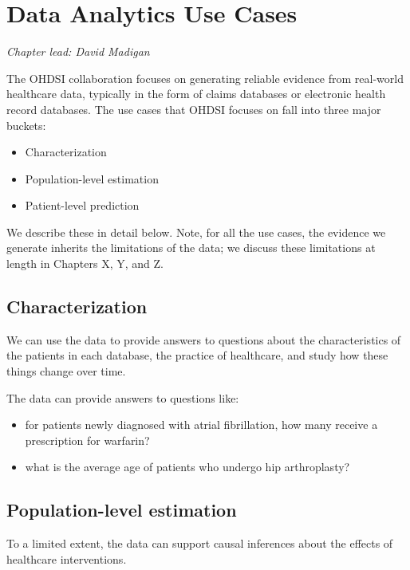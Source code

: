 \documentclass[11pt]{book}
\providecommand{\tightlist}{%
  \setlength{\itemsep}{0pt}\setlength{\parskip}{0pt}}
\begin{document}
\chapter{Data Analytics Use Cases}\label{DataAnalyticsUseCases}

\emph{Chapter lead: David Madigan}

The OHDSI collaboration focuses on generating reliable evidence from
real-world healthcare data, typically in the form of claims databases or
electronic health record databases. The use cases that OHDSI focuses on
fall into three major buckets:

\begin{itemize}
\tightlist
\item
  Characterization
\item
  Population-level estimation
\item
  Patient-level prediction
\end{itemize}

We describe these in detail below. Note, for all the use cases, the
evidence we generate inherits the limitations of the data; we discuss
these limitations at length in Chapters X, Y, and Z.

\section{Characterization}\label{characterization}

We can use the data to provide answers to questions about the
characteristics of the patients in each database, the practice of
healthcare, and study how these things change over time.

The data can provide answers to questions like:

\begin{itemize}
\tightlist
\item
  for patients newly diagnosed with atrial fibrillation, how many
  receive a prescription for warfarin?
\item
  what is the average age of patients who undergo hip arthroplasty?
\end{itemize}

\section{Population-level estimation}\label{population-level-estimation}

To a limited extent, the data can support causal inferences about the
effects of healthcare interventions.
\end{document}
